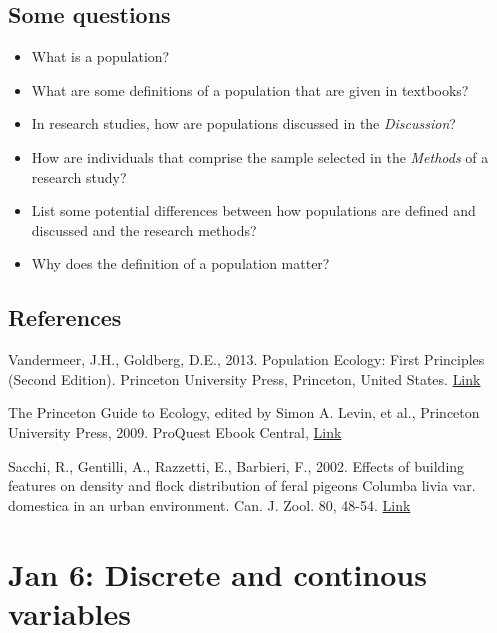 \documentclass[
]{book}
\providecommand{\tightlist}{%
  \setlength{\itemsep}{0pt}\setlength{\parskip}{0pt}}
\begin{document}
\hypertarget{some-questions}{%
\section{Some questions}\label{some-questions}}

\begin{itemize}
\tightlist
\item
  What is a population?
\item
  What are some definitions of a population that are given in textbooks?
\item
  In research studies, how are populations discussed in the \emph{Discussion}?
\item
  How are individuals that comprise the sample selected in the \emph{Methods} of a research study?
\item
  List some potential differences between how populations are defined and discussed and the research methods?
\item
  Why does the definition of a population matter?
\end{itemize}

\hypertarget{references}{%
\section{References}\label{references}}

Vandermeer, J.H., Goldberg, D.E., 2013. Population Ecology: First Principles (Second Edition). Princeton University Press, Princeton, United States. \href{https://ebookcentral-proquest-com.qe2a-proxy.mun.ca/lib/mun/detail.action?docID=1205619}{Link}

The Princeton Guide to Ecology, edited by Simon A. Levin, et al., Princeton University Press, 2009. ProQuest Ebook Central, \href{https://ebookcentral-proquest-com.qe2a-proxy.mun.ca/lib/mun/detail.action?docID=557123}{Link}

Sacchi, R., Gentilli, A., Razzetti, E., Barbieri, F., 2002. Effects of building features on density and flock distribution of feral pigeons Columba livia var. domestica in an urban environment. Can. J. Zool. 80, 48-54. \href{https://cdnsciencepub.com/doi/10.1139/z01-202}{Link}

\hypertarget{jan-6-discrete-and-continous-variables}{%
\chapter{Jan 6: Discrete and continous variables}\label{jan-6-discrete-and-continous-variables}}
\end{document}
